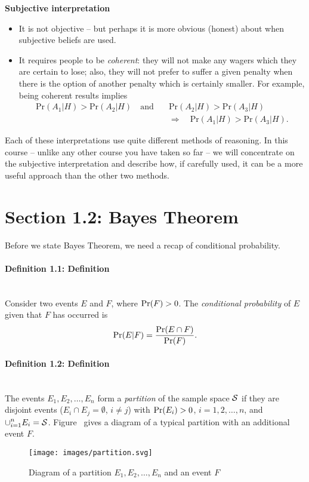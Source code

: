 \textbf{Subjective interpretation}
\begin{itemize}
\item It is not objective -- but perhaps it is more obvious (honest) about when
subjective beliefs are used.
\item It requires people to be {\it coherent}: they will not make any
wagers which they are certain to lose; also, they will not prefer to
suffer a given penalty when there is the option of another penalty
which is certainly smaller. For example, being coherent results implies
\begin{align*}
\text{Pr}(A_1|H)>\text{Pr}(A_2|H)\quad\text{and}\quad &\text{Pr}(A_2|H)>\text{Pr}(A_3|H) \\
&\Longrightarrow\quad \text{Pr}(A_1|H)>\text{Pr}(A_3|H).
\end{align*}
\end{itemize}

Each of these interpretations use quite different methods of
reasoning. In this course -- unlike any other course you have taken so far -- we will concentrate on the subjective interpretation and
describe how, if carefully used, it can be a more useful approach than
the other two methods.

\section{Section 1.2: Bayes Theorem}
Before we state Bayes Theorem, we need a recap of conditional
probability.

\paragraph{Definition 1.1: Definition}{~\\
Consider two events $E$ and $F$, where $\textnormal{Pr}(F)>0$. The
\textit{conditional probability} of $E$ given that $F$ has occurred is
$$
\textnormal{Pr}(E|F)=\frac{\textnormal{Pr}(E\cap F)}{\textnormal{Pr}(F)}.
$$}

\paragraph{Definition 1.2: Definition}{~\\
The events $E_1,E_2,\ldots,E_n$ form a {\it partition} of the sample
space ${\cal S}$ if they are disjoint events ($E_i\cap E_j=\emptyset$,
$i\neq j$) with $\textnormal{Pr}(E_i)>0$, $i=1,2,\ldots,n$, and
$\displaystyle{\cup_{i=1}^n E_i}={\cal S}$.
Figure~ gives a diagram of a typical partition with
an additional event $F$.

\begin{figure}[ht]

\texttt{[image: images/partition.svg]}
\caption{Diagram of a partition $E_1,E_2,\ldots,E_n$ and an event $F$}


\end{figure}}
\clearpage
